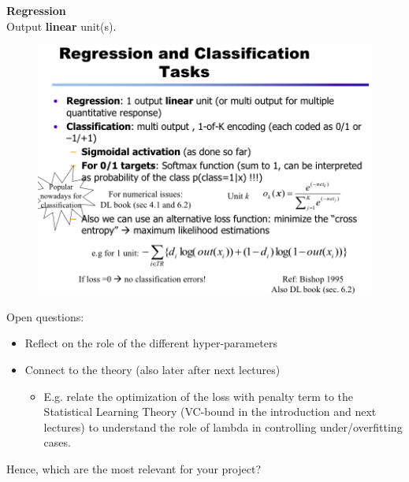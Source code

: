 \documentclass[../main.tex]{subfiles}
\begin{document}
\noindent\textbf{Regression}\\
\noindent Output \textbf{linear} unit(s).
\begin{figure}[H]
    \centering
    \includegraphics[scale = 0.35]{lectures/4_neural_networks/4_in_out.png}
    \label{fig:4_in_out}
\end{figure}

Open questions:
\begin{itemize}
    \item Reflect on the role of the different hyper-parameters
    \item Connect to the theory (also later after next lectures)
    \begin{itemize}
        \item E.g. relate the optimization of the loss with penalty term to the Statistical Learning Theory (VC-bound in the introduction and next lectures) to understand the role of lambda in controlling under/overfitting cases.
    \end{itemize}
\end{itemize}
Hence, which are the most relevant for your project?
\end{document}
